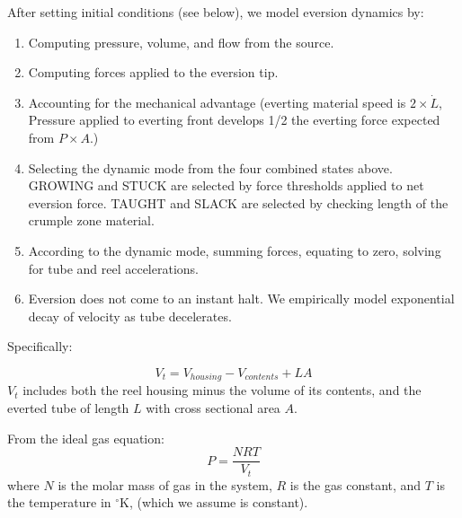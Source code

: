 \documentclass[letterpaper]{article}
\begin{document}
After setting initial conditions (see below), we model eversion dynamics by:
\begin{enumerate}
  \item Computing pressure, volume, and flow from the source.
  \item Computing forces applied to the eversion tip.
  \item Accounting for the mechanical advantage (everting material speed is $2\times\dot{L}$, Pressure applied to everting front develops 1/2 the everting force expected from $P\times A$.)

  \item Selecting the dynamic mode from the four combined states above.
  GROWING and STUCK are selected by force thresholds applied to net
  eversion force.    TAUGHT and SLACK are selected by checking length of
  the crumple zone material.

  \item According to the dynamic mode, summing forces, equating to  zero, solving for tube and reel accelerations.
  \item Eversion does not come to an instant halt. We  empirically model exponential decay of velocity as tube decelerates.
\end{enumerate}

\noindent
Specifically:

\begin{equation}\label{eqOneCompartmentVol}
V_t = V_{housing} - V_{contents} + L  A
\end{equation}
$V_t$ includes both the reel housing minus the volume of its contents,
and the everted tube of length $L$ with cross sectional area $A$.

From the ideal gas equation:
\begin{equation}\label{eqOneCompartmentPress}
P = \frac{N  RT}{ V_t}
\end{equation}
where $N$ is the molar mass of gas in the system, $R$ is the gas constant, and $T$ is the temperature
in $^\circ$K, (which we assume is constant).
\end{document}
